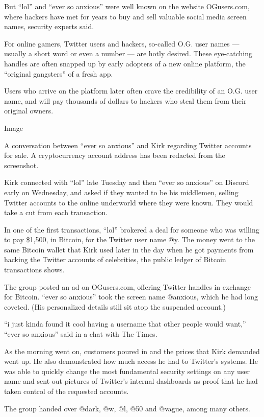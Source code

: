 But ``lol'' and ``ever so anxious'' were well known on the website
OGusers.com, where hackers have met for years to buy and sell valuable
social media screen names, security experts said.

For online gamers, Twitter users and hackers, so-called O.G. user names
--- usually a short word or even a number --- are hotly desired. These
eye-catching handles are often snapped up by early adopters of a new
online platform, the ``original gangsters'' of a fresh app.

Users who arrive on the platform later often crave the credibility of an
O.G. user name, and will pay thousands of dollars to hackers who steal
them from their original owners.

Image

A conversation between ``ever so anxious'' and Kirk regarding Twitter
accounts for sale. A cryptocurrency account address has been redacted
from the screenshot.

Kirk connected with ``lol'' late Tuesday and then ``ever so anxious'' on
Discord early on Wednesday, and asked if they wanted to be his
middlemen, selling Twitter accounts to the online underworld where they
were known. They would take a cut from each transaction.

In one of the first transactions, ``lol'' brokered a deal for someone
who was willing to pay \$1,500, in Bitcoin, for the Twitter user name
@y. The money went to the same Bitcoin wallet that Kirk used later in
the day when he got payments from hacking the Twitter accounts of
celebrities, the public ledger of Bitcoin transactions shows.

The group posted an ad on OGusers.com, offering Twitter handles in
exchange for Bitcoin. ``ever so anxious'' took the screen name @anxious,
which he had long coveted. (His personalized details still sit atop the
suspended account.)

``i just kinda found it cool having a username that other people would
want,'' ``ever so anxious'' said in a chat with The Times.

As the morning went on, customers poured in and the prices that Kirk
demanded went up. He also demonstrated how much access he had to
Twitter's systems. He was able to quickly change the most fundamental
security settings on any user name and sent out pictures of Twitter's
internal dashboards as proof that he had taken control of the requested
accounts.

The group handed over @dark, @w, @l, @50 and @vague, among many others.

